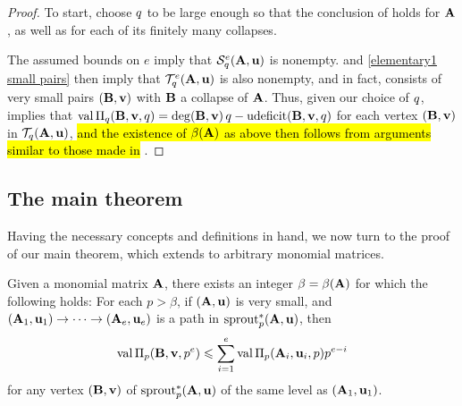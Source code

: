 \documentclass{amsart}
\begin{document}
\begin{proof}
   To start, choose $q$ to be large enough so that the conclusion of  holds for $\mathbf{A}$, as well as for each of its finitely many collapses.
   
   The assumed bounds on $e$ imply that $\mathcal{S}_{q}^e(\mathbf{A}, \mathbf{u})$ is nonempty.  and \ref{elementary1 small pairs} then imply that $\mathcal{T}_{q}^e(\mathbf{A}, \mathbf{u})$ is also nonempty, and in fact, consists of very small pairs $(\mathbf{B}, \mathbf{v})$ with $\mathbf{B}$ a collapse of $\mathbf{A}$.  Thus, given our choice of $q$,  implies that $\operatorname{val} \Pi_q(\mathbf{B},\mathbf{v}, q) = \operatorname{deg}(\mathbf{B},\mathbf{v})\, q-\operatorname{udeficit}(\mathbf{B},\mathbf{v}, q)$  for each vertex $(\mathbf{B},\mathbf{v})$ in $\mathcal{T}_{q}(\mathbf{A},\mathbf{u})$, \hl{and the existence of $\beta(\mathbf{A})$ as above then follows from arguments similar to those made in} . 
\end{proof}

\subsection{The main theorem}

Having the necessary concepts and definitions in hand, we now turn to the proof of our main theorem, which extends  to arbitrary monomial matrices.

\begin{lemma}\label{lem: upper bound for higher mu}
   Given a monomial matrix $\mathbf{A}$, there exists an integer $\beta= \beta(\mathbf{A})$ for which the following holds\textup:
   For each $p>\beta$, if $(\mathbf{A}, \mathbf{u})$ is very small, and $(\mathbf{A}_1, \mathbf{u}_1) \to \cdots \to (\mathbf{A}_e, \mathbf{u}_e)$ is a path in $\operatorname{sprout}^{\ast}_p(\mathbf{A},\mathbf{u})$,  then
   \[
      \operatorname{val} \Pi_p(\mathbf{B}, \mathbf{v}, p^e) \leqslant \sum_{i=1}^e \operatorname{val} \Pi_p(\mathbf{A}_i, \mathbf{u}_i, p)p^{e-i}
   \]
   for any vertex $(\mathbf{B}, \mathbf{v})$ of $\operatorname{sprout}^{\ast}_p(\mathbf{A},\mathbf{u})$ of the same level as $(\mathbf{A}_1, \mathbf{u}_1)$.
\end{lemma}
\end{document}
